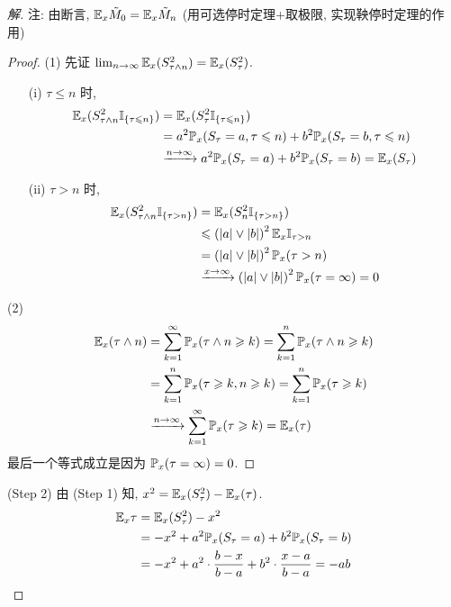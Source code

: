\begin{proof}[解]
注: 由断言, $\mathbb E_x \tilde{M}_0=\mathbb E_x \tilde{M}_n$ (用可选停时定理+取极限, 实现鞅停时定理的作用)
\begin{proof}
    (1) 先证 $\lim_{n \to \infty}\mathbb E_x(S_{\tau\land n}^2)=\mathbb E_x(S_{\tau}^2)$.
    \begin{enumerate}
        \item[(i)] $\tau\leq n$ 时,
        \[
        \begin{aligned}
            \mathbb E_x(S_{\tau\land n}^2\mathbb I_{\{\tau\leqslant n\}}) &=\mathbb E_x(S_{\tau}^2\mathbb I_{\{\tau\leqslant n\}})\\
            &=a^2\mathbb{P}_x(S_{\tau}=a,\tau\leqslant n)+b^2\mathbb{P}_x(S_{\tau}=b,\tau\leqslant n)\\
            &\xrightarrow{n\to\infty}a^2\mathbb{P}_x(S_{\tau}=a)+b^2\mathbb{P}_x(S_{\tau}=b)=\mathbb E_x(S_{\tau})
        \end{aligned}
        \]
        \item[(ii)] $\tau>n$ 时,
        \[
        \begin{aligned}
        \mathbb E_x(S_{\tau\land n}^2\mathbb I_{\{\tau>n\}}) &=\mathbb E_x(S_n^2\mathbb I_{\{\tau>n\}})\\
        &\leqslant \left(|a|\lor |b|\right)^2 \mathbb E_x\mathbb I_{\tau>n}\\
        &=\left(|a|\lor |b|\right)^2 \mathbb{P}_x(\tau>n)\\
        &\xrightarrow{x\to\infty}\left(|a|\lor |b|\right)^2 \mathbb{P}_x(\tau=\infty)=0
        \end{aligned}
        \]
    \end{enumerate}
    (2) 
    \[
    \begin{aligned}
        \mathbb E_x(\tau\land n)&=\sum_{k=1}^{\infty} \mathbb{P}_x(\tau\land n\geqslant k)=\sum_{k=1}^{n}\mathbb{P}_x(\tau\land n\geqslant k)\\
        &=\sum_{k=1}^{n}\mathbb{P}_x(\tau\geqslant k,n\geqslant k)=\sum_{k=1}^n\mathbb{P}_x(\tau\geqslant k)\\
        &\xrightarrow{n\to\infty}\sum_{k=1}^{\infty}\mathbb{P}_x(\tau\geqslant k)=\mathbb E_x(\tau)
    \end{aligned}
    \]
    最后一个等式成立是因为 $\mathbb{P}_x(\tau=\infty)=0$.
\end{proof}

(Step 2) 由 (Step 1) 知, $x^2=\mathbb E_x(S_{\tau}^2)-\mathbb E_x(\tau)$.
\[
\begin{aligned}
    \mathbb E_x\tau &=\mathbb E_x(S_{\tau}^2)-x^2\\
    &=-x^2 +a^2\mathbb{P}_x(S_{\tau}=a)+b^2 \mathbb{P}_x(S_{\tau}=b)\\
    &=-x^2+a^2\cdot \frac{b-x}{b-a}+b^2\cdot \frac{x-a}{b-a}=-ab
\end{aligned}
\] 


\end{proof}
